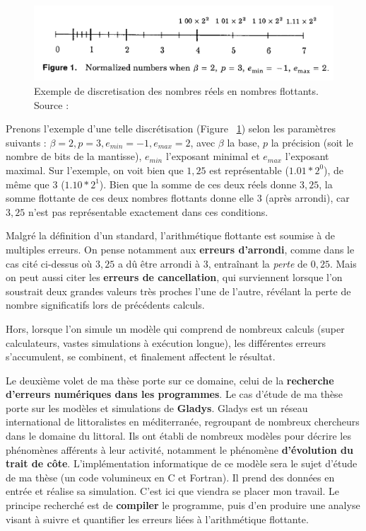 \documentclass[a4paper,11pt]{article}
\begin{document}
\begin{figure}[b]
  \begin{center}
    \includegraphics[width=12cm]{Floating_point_numbers_discretization}
    \caption{Exemple de discretisation des nombres réels en nombres flottants. Source : \cite{goldberg1991every}}
    \label{discretization}
  \end{center}
\end{figure}

Prenons l'exemple d'une telle discrétisation (Figure ~\ref{discretization}) selon les paramètres suivants : $\beta=2, p=3, e_{min}=-1,e_{max}=2$, avec $\beta$ la base, $p$ la précision (soit le nombre de bits de la mantisse), $e_{min}$ l'exposant minimal et $e_{max}$ l'exposant maximal.
Sur l'exemple, on voit bien que $1,25$ est représentable ($1.01*2^{0}$), de même que $3$ ($1.10*2^{1}$). Bien que la somme de ces deux réels donne $3,25$, la somme flottante de ces deux nombres flottants donne elle $3$ (après arrondi), car $3,25$ n'est pas représentable exactement dans ces conditions.

Malgré la définition d'un standard, l'arithmétique flottante est soumise à de multiples erreurs. On pense notamment aux \textbf{erreurs d'arrondi}, comme dans le cas cité ci-dessus où $3,25$ a dû être arrondi à $3$, entraînant la \textit{perte} de $0,25$. Mais on peut aussi citer les \textbf{erreurs de cancellation}, qui surviennent lorsque l'on soustrait deux grandes valeurs très proches l'une de l'autre, révélant la perte de nombre significatifs lors de précédents calculs. %

Hors, lorsque l’on simule un modèle qui comprend de nombreux calculs (super calculateurs, vastes simulations à exécution longue), les différentes erreurs s’accumulent, se combinent, et finalement affectent le résultat.

Le deuxième volet de ma thèse porte sur ce domaine, celui de la \textbf{recherche d'erreurs numériques dans les programmes}.
Le cas d’étude de ma thèse porte sur les modèles et simulations de \textbf{Gladys}\cite{gladysweb}.
Gladys est un réseau international de littoralistes en méditerranée, regroupant de nombreux chercheurs dans le domaine du littoral.
Ils ont établi de nombreux modèles pour décrire les phénomènes afférents à leur activité, notamment le phénomène \textbf{d’évolution du trait de côte}.
L’implémentation informatique de ce modèle sera le sujet d’étude de ma thèse (un code volumineux en C et Fortran). Il prend des données en entrée et réalise sa simulation. C'est ici que viendra se placer mon travail. Le principe recherché est de \textbf{compiler} le programme, puis d’en produire une analyse visant à suivre et quantifier les erreurs liées à l’arithmétique flottante.
\end{document}
